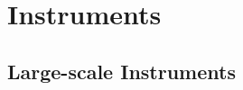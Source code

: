 \documentclass[\main/dresen_thesis.tex]{subfiles}
\renewcommand{\thisPath}{\main/chapters/largeScaleInstruments}
\begin{document}
\chapter{Instruments}
  \section{Large-scale Instruments}
    
      \FloatBarrier
    
      \FloatBarrier
    
      \FloatBarrier
    
      \FloatBarrier
    
      \FloatBarrier
    
      \FloatBarrier
    
      \FloatBarrier

  
    \FloatBarrier
\end{document}
